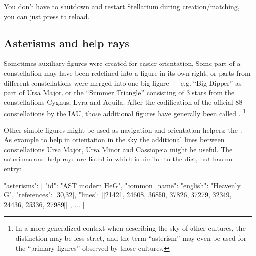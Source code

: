 You don't have to shutdown and restart Stellarium during
creation/matching, you can just press  to reload.


\subsection{Asterisms and help rays}
\label{sec:skycultures:asterisms}
\label{SC:asterisms}

Sometimes auxiliary figures were created for easier orientation. Some part of a 
constellation may have been redefined into a figure in its own right, or  parts from different 
constellations were merged into one big figure --- e.g. ``Big Dipper'' as part of Ursa Major, or the 
``Summer Triangle'' consisting of 3 stars from the constellations Cygnus, Lyra and Aquila. 
After the codification of the official 88 constellations by the IAU, those additional figures
have generally been called . \footnote{In a more generalized context when describing the sky of
  other cultures, the distinction may be less strict, and the term ``asterism'' may even be used 
  for the ``primary figures'' observed by those cultures.}

Other simple figures might be used as navigation and orientation helpers: the . 
As example to help in orientation in the sky the additional lines between constellations 
Ursa Major, Ursa Minor and Cassiopeia might be useful. The asterisms and help rays are listed in
 which is similar to the  dict, but has no  entry:

\begin{jsonfile}[\scriptsize]
"asterisms": [
    {
      "id": "AST modern HeG",
      "common_name": {"english": "Heavenly G", "references": [30,32]},
      "lines": [[21421, 24608, 36850, 37826, 37279, 32349, 24436, 25336, 27989]]
    }, ...
]
\end{jsonfile}

